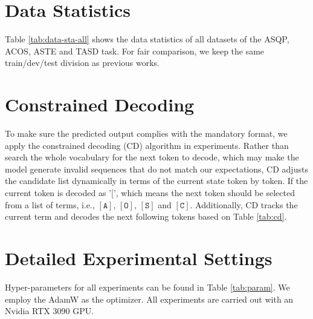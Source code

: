 \documentclass[11pt]{article}
\begin{document}



\newpage
\appendix

\section{Data Statistics}
\label{sec:appendix:data}


Table \ref{tab:data-sta-all} shows the data statistics of all datasets of the ASQP, ACOS, ASTE and TASD task. For fair comparison, we keep the same train/dev/test division as previous works. 



\section{Constrained Decoding}
\label{sec:appendix:cd}
To make sure the predicted output complies with the mandatory format, we apply the constrained decoding (CD) algorithm in experiments. Rather than search the whole vocabulary for the next token to decode, which may make the model generate invalid sequences that do not match our expectations, CD adjusts the candidate list dynamically in terms of the current state token by token. If the current token is decoded as '[', which means the next token should be selected from a list of terms, i.e., $[\mathtt{A}]$, $[\mathtt{O}]$, $[\mathtt{S}]$ and $[\mathtt{C}]$. Additionally, CD tracks the current term and decodes the next following tokens based on Table \ref{tab:cd}.

\begin{table}[h]
  \centering
\caption{Candidate lists of different terms}
\label{tab:cd}
\end{table} 

\section{Detailed Experimental Settings}
\label{sec:appendix:exps}
Hyper-parameters for all experiments can be found in Table \ref{tab:param}. 
We employ the AdamW \cite{DBLP:conf/iclr/LoshchilovH19} as the optimizer. All experiments are carried out with an Nvidia RTX 3090 GPU. 
\end{document}
